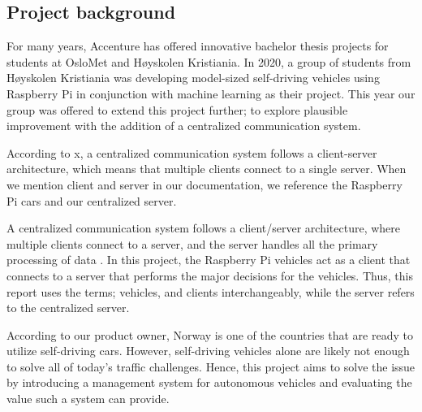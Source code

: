 \subsection{Project background}
For many years, Accenture has offered innovative bachelor thesis projects for students at OsloMet and Høyskolen Kristiania. In 2020, a group of students from Høyskolen Kristiania was developing model-sized self-driving vehicles using Raspberry Pi in conjunction with machine learning as their project. This year our group was offered to extend this project further; to explore plausible improvement with the addition of a centralized communication system.


According to x, a centralized communication system follows a client-server architecture, which means that multiple clients connect to a single server. When we mention client and server in our documentation, we reference the Raspberry Pi cars and our centralized server.

A centralized communication system follows a client/server architecture, where multiple clients connect to a server, and the server handles all the primary processing of data \parencite{centralized}. In this project, the Raspberry Pi vehicles act as a client that connects to a server that performs the major decisions for the vehicles. Thus, this report uses the terms; vehicles, and clients interchangeably, while the server refers to the centralized server.

According to our product owner, Norway is one of the countries that are ready to utilize self-driving cars. However, self-driving vehicles alone are likely not enough to solve all of today's traffic challenges. Hence, this project aims to solve the issue by introducing a management system for autonomous vehicles and evaluating the value such a system can provide.
